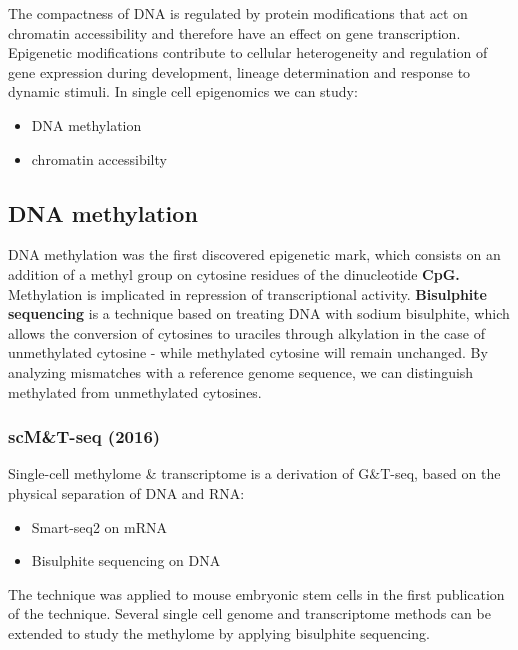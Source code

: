 The compactness of DNA is regulated by protein modifications that act on
chromatin accessibility and therefore have an effect on gene
transcription. Epigenetic modifications contribute to cellular
heterogeneity and regulation of gene expression during development,
lineage determination and response to dynamic stimuli. In single cell
epigenomics we can study:

\begin{itemize}
\tightlist
\item
  DNA methylation
\item
  chromatin accessibilty
\end{itemize}

\hypertarget{dna-methylation}{%
\subsection{DNA methylation}\label{dna-methylation}}

DNA methylation was the first discovered epigenetic mark, which consists
on an addition of a methyl group on cytosine residues of the
dinucleotide \textbf{CpG.} Methylation is implicated in repression of
transcriptional activity. \textbf{Bisulphite sequencing} is a technique
based on treating DNA with sodium bisulphite, which allows the
conversion of cytosines to uraciles through alkylation in the case of
unmethylated cytosine - while methylated cytosine will remain unchanged.
By analyzing mismatches with a reference genome sequence, we can
distinguish methylated from unmethylated cytosines.

\hypertarget{scmt-seq-2016}{%
\subsubsection{scM\&T-seq (2016)}\label{scmt-seq-2016}}

Single-cell methylome \& transcriptome is a derivation of G\&T-seq,
based on the physical separation of DNA and RNA:

\begin{itemize}
\tightlist
\item
  Smart-seq2 on mRNA
\item
  Bisulphite sequencing on DNA
\end{itemize}

The technique was applied to mouse embryonic stem cells in the first
publication of the technique. Several single cell genome and
transcriptome methods can be extended to study the methylome by applying
bisulphite sequencing.

